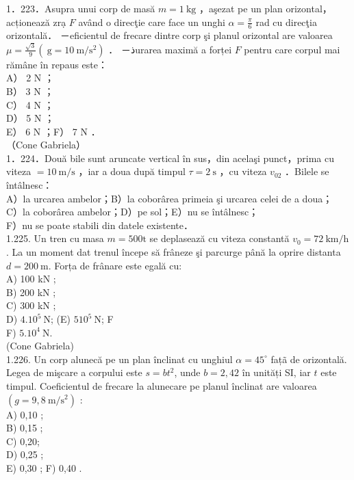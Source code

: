\documentclass[10pt]{article}
\begin{document}
1．223．Asupra unui corp de masă $m=1 \mathrm{~kg}$ ，aşezat pe un plan orizontal，acționează zrạ $F$ având o direcţie care face un unghi $\alpha=\frac{\pi}{6}$ rad cu direcţia orizontală． －eficientul de frecare dintre corp şi planul orizontal are valoarea $\mu=\frac{\sqrt{3}}{9}\left(\mathrm{~g}=10 \mathrm{~m} / \mathrm{s}^{2}\right)$ ． －ذurarea maximă a forței $F$ pentru care corpul mai rămâne în repaus este：\\
A） 2 N ；\\
B） 3 N ；\\
C） 4 N ；\\
D） 5 N ；\\
E） 6 N ；F） 7 N ．\\
（Cone Gabriela）\\
1．224．Două bile sunt aruncate vertical în sus，din acelaşi punct，prima cu viteza $=10 \mathrm{~m} / \mathrm{s}$ ，iar a doua după timpul $\tau=2 \mathrm{~s}$ ，cu viteza $v_{02}$ ．Bilele se întâlnesc：\\
A）la urcarea ambelor；B）la coborârea primeia şi urcarea celei de a doua；\\
C）la coborârea ambelor；D）pe sol；E）nu se întâlnesc；\\
F）nu se poate stabili din datele existente．\\
1.225. Un tren cu masa $m=500 \mathrm{t}$ se deplasează cu viteza constantă $v_{0}=72 \mathrm{~km} / \mathrm{h}$. La un moment dat trenul începe să frâneze şi parcurge până la oprire distanta $d=200 \mathrm{~m}$. Forța de frânare este egală cu:\\
A) 100 kN ;\\
B) 200 kN ;\\
C) 300 kN ;\\
D) $4.10^{5} \mathrm{~N}$; (E) $510^{5} \mathrm{~N}$; F\\
F) $5.10^{4} \mathrm{~N}$.\\
(Cone Gabriela)\\
1.226. Un corp alunecă pe un plan înclinat cu unghiul $\alpha=45^{\circ}$ fațã de orizontală. Legea de mişcare a corpului este $s=b t^{2}$, unde $b=2,42$ în unități SI, iar $t$ este timpul. Coeficientul de frecare la alunecare pe planul înclinat are valoarea $\left(g=9,8 \mathrm{~m} / \mathrm{s}^{2}\right)$ :\\
A) 0,10 ;\\
B) 0,15 ;\\
C) 0,20;\\
D) 0,25 ;\\
E) 0,30 ; F) 0,40 .\\
\end{document}
